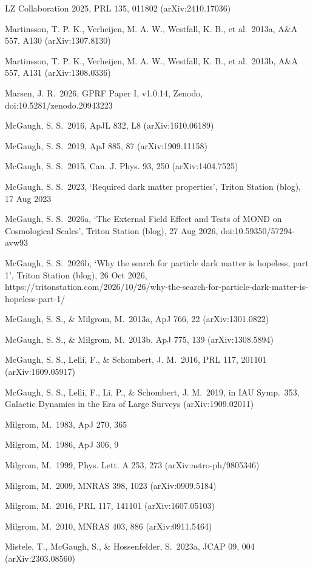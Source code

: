\documentclass[
  10pt,
]{article}
\begin{document}
{\begin{list}{}{\setlength{\leftmargin}{1.5em}\setlength{\itemindent}{-1.5em}\setlength{\itemsep}{1pt}\setlength{\parsep}{0pt}}
\item LZ Collaboration 2025, PRL 135, 011802 (arXiv:2410.17036)
\item Martinsson, T. P. K., Verheijen, M. A. W., Westfall, K. B., et al.\ 2013a, A\&A 557, A130 (arXiv:1307.8130)
\item Martinsson, T. P. K., Verheijen, M. A. W., Westfall, K. B., et al.\ 2013b, A\&A 557, A131 (arXiv:1308.0336)
\item Marsen, J. R.\ 2026, GPRF Paper I, v1.0.14, Zenodo, doi:10.5281/zenodo.20943223
\item McGaugh, S. S.\ 2016, ApJL 832, L8 (arXiv:1610.06189)
\item McGaugh, S. S.\ 2019, ApJ 885, 87 (arXiv:1909.11158)
\item McGaugh, S. S.\ 2015, Can. J. Phys. 93, 250 (arXiv:1404.7525)
\item McGaugh, S. S.\ 2023, `Required dark matter properties', Triton Station (blog), 17 Aug 2023
\item McGaugh, S. S.\ 2026a, `The External Field Effect and Tests of MOND on Cosmological Scales', Triton Station (blog), 27 Aug 2026, doi:10.59350/57294-avw93
\item McGaugh, S. S.\ 2026b, `Why the search for particle dark matter is hopeless, part 1', Triton Station (blog), 26 Oct 2026, https://tritonstation.com/2026/10/26/why-the-search-for-particle-dark-matter-is-hopeless-part-1/
\item McGaugh, S. S., \& Milgrom, M.\ 2013a, ApJ 766, 22 (arXiv:1301.0822)
\item McGaugh, S. S., \& Milgrom, M.\ 2013b, ApJ 775, 139 (arXiv:1308.5894)
\item McGaugh, S. S., Lelli, F., \& Schombert, J. M.\ 2016, PRL 117, 201101 (arXiv:1609.05917)
\item McGaugh, S. S., Lelli, F., Li, P., \& Schombert, J. M.\ 2019, in IAU Symp.~353, Galactic Dynamics in the Era of Large Surveys (arXiv:1909.02011)
\item Milgrom, M.\ 1983, ApJ 270, 365
\item Milgrom, M.\ 1986, ApJ 306, 9
\item Milgrom, M.\ 1999, Phys. Lett. A 253, 273 (arXiv:astro-ph/9805346)
\item Milgrom, M.\ 2009, MNRAS 398, 1023 (arXiv:0909.5184)
\item Milgrom, M.\ 2016, PRL 117, 141101 (arXiv:1607.05103)
\item Milgrom, M.\ 2010, MNRAS 403, 886 (arXiv:0911.5464)
\item Mistele, T., McGaugh, S., \& Hossenfelder, S.\ 2023a, JCAP 09, 004 (arXiv:2303.08560)

\end{list}}
\end{document}
